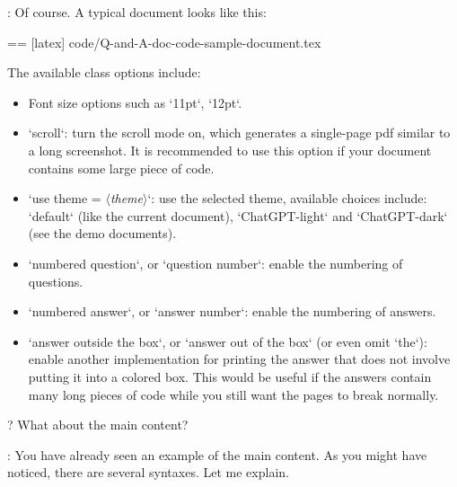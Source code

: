 \documentclass[%
  use style = classical,
  scroll,
]{Q-and-A}
\newcommand{\meta}[1]{$\langle${\normalfont\itshape#1}$\rangle$}
\begin{document}
:
  Of course. A typical document looks like this:

  == [latex] {code/Q-and-A-doc-code-sample-document.tex}

  The available class options include:
  \begin{itemize}
    \item Font size options such as `11pt`, `12pt`.
    \item `scroll`: turn the scroll mode on, which generates a single-page pdf similar to a long screenshot. It is recommended to use this option if your document contains some large piece of code.
    \item `use theme = \meta{theme}`: use the selected theme, available choices include: `default` (like the current document), `ChatGPT-light` and `ChatGPT-dark` (see the demo documents).
    \item `numbered question`, or `question number`: enable the numbering of questions.
    \item `numbered answer`, or `answer number`: enable the numbering of answers.
    \item `answer outside the box`, or `answer out of the box` (or even omit `the`): enable another implementation for printing the answer that does not involve putting it into a colored box. This would be useful if the answers contain many long pieces of code while you still want the pages to break normally.
  \end{itemize}

?
  What about the main content?

:
  You have already seen an example of the main content. As you might have noticed, there are several syntaxes. Let me explain.
\end{document}
